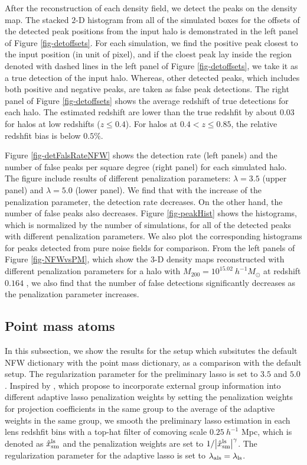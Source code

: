 \documentclass[twocolumn]{aastex62}
\begin{document}
After the reconstruction of each density field, we detect the peaks on the density map. The stacked $2$-D histogram from all of
the simulated boxes for the offsets of the detected peak positions from the input halo is demonstrated in the left panel of 
Figure \ref{fig-detoffsets}. For each simulation, we find the positive peak closest to the input position (in unit of pixel), and
if the cloest peak lay inside the region denoted with dashed lines in the left panel of Figure \ref{fig-detoffsets}, we take it
as a true detection of the input halo. Whereas, other detected peaks, which includes both positive and negative peaks, are taken as 
false peak detections. The right panel of Figure \ref{fig-detoffsets} shows the average redshift of true detections for each halo.
The estimated redshift are lower than the true redshfit by about $0.03$ for halos at low redshifts ($z\leq 0.4$). For halos at 
$0.4<z\leq 0.85$, the relative redshfit bias is below $0.5\%$.

Figure \ref{fig-detFalsRateNFW} shows the detection rate (left panels) and the number of false peaks per square degree (right panel) 
for each simulated halo. The figure include results of different penalization parameters: $\lambda=3.5$ (upper panel) 
and $\lambda=5.0$ (lower panel).
We find that with the increase of the penalization parameter, the detection rate decreases. On the other hand, the number of false 
peaks also decreases.
Figure \ref{fig-peakHist} shows the histograms, which is normalized by the number of simulations, for all of the detected peaks 
with different penalization parameters. We also plot the corresponding histograms for peaks detected from pure noise fields for 
comparison. From the left panels of Figure \ref{fig-NFWvsPM}, which show the $3$-D density maps reconstructed with different 
penalization parameters for a halo with $M_{200}=10^{15.02} ~h^{-1}M_{\odot}$ at redshift $0.164$ , we also find that the number 
of false detections significantly decreases as the penalization parameter increases.


\subsection{Point mass atoms}
\label{subsec:test-pm}

In this subsection, we show the results for the setup which subsitutes the default NFW dictionary with the point mass dictionary, 
as a comparison with the default setup.
The regularization parameter for the preliminary lasso is set to $3.5$ and $5.0$. 
Inspired by \citet{structureAdaLasso-Pramanik2020}, which propose to incorporate external group information into
different adaptive lasso penalization weights by setting the penalization weights for projection coefficients in 
the same group to the average of the adaptive weights in the same group, we smooth the preliminary lasso estimation 
in each lens redshfit bins with a top-hat filter of comoving scale $0.25~h^{-1}$ Mpc, which is denoted as 
$\hat{x}^{\rm{ls}}_{\rm{sm}}$ and the penalization weights are set to $1/\abs{\hat{x}^{\rm{ls}}_{\rm{sm}}}^\gamma$. 
The regularization parameter for the adaptive lasso is set to $\lambda_{\rm{als}}=\lambda_{\rm{ls}}$.
\end{document}
